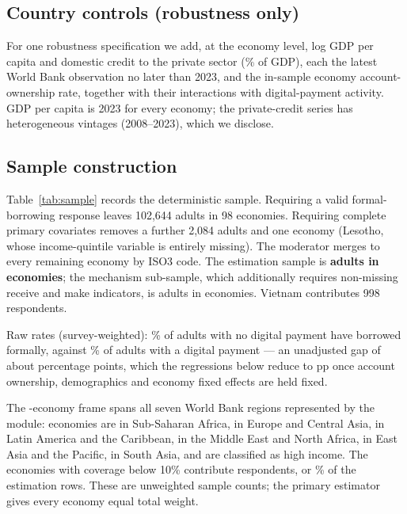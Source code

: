 \subsection{Country controls (robustness only)}

For one robustness specification we add, at the economy level, log GDP per capita and
domestic credit to the private sector (\% of GDP), each the latest World Bank observation no
later than 2023, and the in-sample economy account-ownership rate, together with their
interactions with digital-payment activity. GDP per capita is 2023 for every economy; the
private-credit series has heterogeneous vintages (2008--2023), which we disclose.

\subsection{Sample construction}

Table~\ref{tab:sample} records the deterministic sample. Requiring a valid formal-borrowing
response leaves 102{,}644 adults in 98 economies. Requiring complete primary covariates
removes a further 2{,}084 adults and one economy (Lesotho, whose income-quintile variable is
entirely missing). The moderator merges to every remaining economy by ISO3 code. The
estimation sample is \textbf{\NAdults{} adults in \NEconomies{} economies}; the mechanism
sub-sample, which additionally requires non-missing receive and make indicators, is
\NMechAdults{} adults in \NMechEconomies{} economies. Vietnam contributes 998 respondents.



Raw rates (survey-weighted): \RawRateNoDig\% of adults with no digital payment have borrowed
formally, against \RawRateDig\% of adults with a digital payment --- an unadjusted gap of
about \RawGap{} percentage points, which the regressions below reduce to \MOneBeta{} pp once
account ownership, demographics and economy fixed effects are held fixed.

The \NEconomies{}-economy frame spans all seven World Bank regions represented by the
module: \RegionSSA{} economies are in Sub-Saharan Africa, \RegionECA{} in Europe and Central
Asia, \RegionLAC{} in Latin America and the Caribbean, \RegionMENA{} in the Middle East and
North Africa, \RegionEAP{} in East Asia and the Pacific, \RegionSA{} in South Asia, and
\RegionHIC{} are classified as high income. The \ThinCoverageEconomies{} economies with
coverage below 10\% contribute \ThinShareN{} respondents, or \ThinSharePct\% of the
estimation rows. These are unweighted sample counts; the primary estimator gives every
economy equal total weight.

